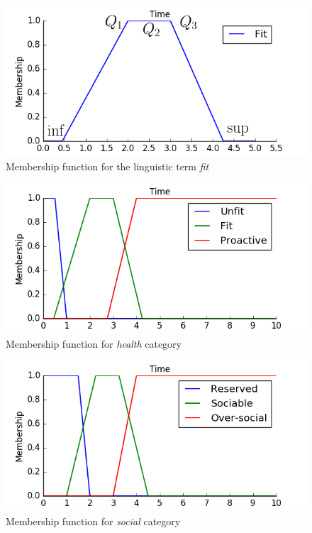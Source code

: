 \documentclass[conference]{IEEEtran}
\begin{document}
\begin{figure}[h!]
\centering
\captionsetup{justification=centering}
\noindent \includegraphics[scale=0.35]{fit}
\caption{Membership function for the linguistic term \textit{fit}}
\end{figure}
\begin{figure}[h!]
\centering
\captionsetup{justification=centering}
\noindent \includegraphics[scale=0.35]{health}
\caption{Membership function for \textit{health} category}
\end{figure}
\begin{figure}[h!]
\centering
\captionsetup{justification=centering}
\noindent \includegraphics[scale=0.35]{social}
\caption{Membership function for \textit{social} category}
\end{figure}
\end{document}
